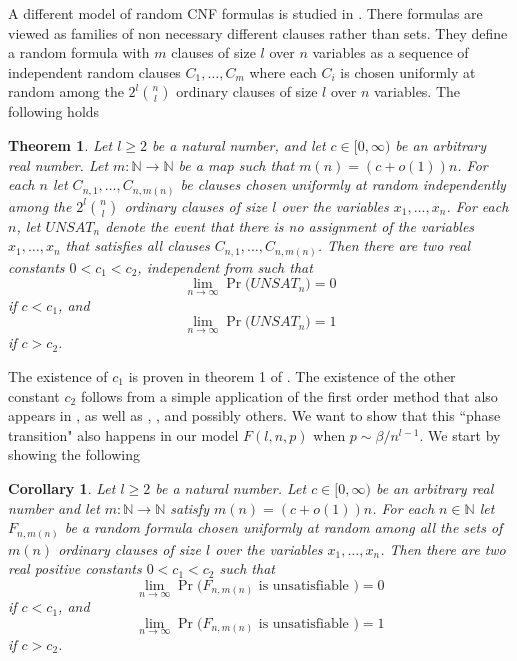 \documentclass[12pt,notitlepage,a4paper]{article}
\newtheorem{theorem}{Theorem}[section]
\newtheorem{corollary}{Corollary}[section]
\theoremstyle{definition}
\newcommand{\N}{\mathbb{N}}
\newcommand{\Ln}{\lim\limits_{n\to \infty}}
\begin{document}
A different model of random CNF formulas is studied in \cite{chvatal1992mick}. There 
formulas are viewed as families of non necessary different clauses rather than sets.
They define a random formula with $m$ clauses of size $l$ over $n$ variables as
a sequence of independent 
random clauses $C_1,\dots, C_m$ where each $C_i$ is chosen uniformly at random among
the $2^l \binom{n}{l}$ ordinary clauses of size $l$ over $n$ variables. The 
following holds
\begin{theorem} 
Let $l\geq 2$ be a natural number, and let $c\in [0,\infty)$ 
be an arbitrary real number. 
Let $m:\N\rightarrow \N$ be a map such that
$m(n)=(c+o(1))n$. For each $n$ let $C_{n,1},\dots, C_{n,m(n)}$
be clauses chosen uniformly at random independently among the 
$2^l \binom{n}{l}$ ordinary clauses of size $l$ over the
variables $x_1,\dots, x_n$. For each $n$, let $UNSAT_n$
denote the event that there is no assignment of the variables
$x_1,\dots,x_n$ that satisfies all clauses $C_{n,1},\dots, C_{n,m(n)}$. 
Then there are two real constants $0<c_1<c_2$, independent from such that 
\[
\Ln \Pr\big( UNSAT_n \big)=0
\]
if $c< c_1$, and 
\[
\Ln \Pr\big( UNSAT_n \big)=1
\]
if $c> c_2$. 
\end{theorem}
The existence of $c_1$ is proven in theorem 1 of \cite{chvatal1992mick}. 
The existence of the other constant $c_2$ follows from a simple application of
the first order method that also appears in \cite{chvatal1992mick}, as well as 
\cite{franco1983probabilistic}, \cite{chvatal1988many}, \cite{simon1986etude}
and possibly others. We want to show that this ``phase transition" also happens in
our model $F(l,n,p)$ when $p\sim \beta/n^{l-1}$. We start by showing the following
\begin{corollary}
	Let $l\geq 2$ be a natural number. Let $c\in [0,\infty)$ be an arbitrary
	real number and let $m:\N\rightarrow \N$ satisfy $m(n)=(c+o(1))n$. 
	For each $n\in \N$ let $F_{n,m(n)}$ be a random formula chosen uniformly at
	random among all the sets of $m(n)$ ordinary clauses of size $l$ over
	the variables $x_1,\dots, x_n$. Then there
	are two real positive constants $0<c_1<c_2$ such that
	\[
	\Ln \Pr \big( F_{n,m(n)} \text{ is unsatisfiable } \big)=0
	\]
	if $c< c_1$, and
	\[
	\Ln \Pr \big( F_{n,m(n)} \text{ is unsatisfiable } \big)=1
	\]
	if $c> c_2$.
\end{corollary}
\end{document}
